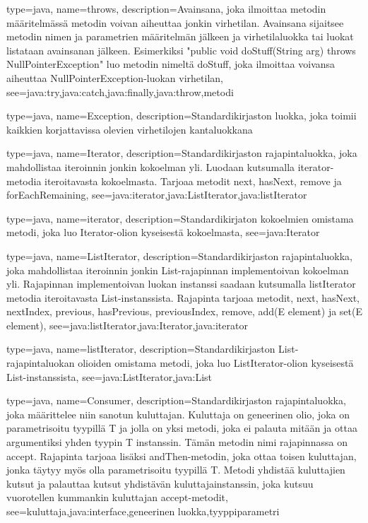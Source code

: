 {
	type=java,
	name=throws,
	description={Avainsana, joka ilmoittaa metodin määritelmässä metodin voivan aiheuttaa jonkin
virhetilan. Avainsana sijaitsee metodin nimen ja parametrien määritelmän jälkeen ja
virhetilaluokka tai luokat listataan avainsanan jälkeen. Esimerkiksi "public void doStuff(String
arg) throws NullPointerException" luo metodin nimeltä doStuff, joka ilmoittaa voivansa aiheuttaa
NullPointerException-luokan virhetilan},
	see={java:try,java:catch,java:finally,java:throw,metodi}
}

{
	type=java,
	name=Exception,
	description={Standardikirjaston luokka, joka toimii kaikkien korjattavissa olevien
virhetilojen kantaluokkana}
}

{
	type=java,
	name=Iterator,
	description={Standardikirjaston rajapintaluokka, joka mahdollistaa iteroinnin jonkin kokoelman
yli. Luodaan kutsumalla iterator-metodia iteroitavasta kokoelmasta. Tarjoaa metodit next, hasNext,
remove ja forEachRemaining},
	see={java:iterator,java:ListIterator,java:listIterator}
}

{
	type=java,
	name=iterator,
	description={Standardikirjaton kokoelmien omistama metodi, joka luo Iterator-olion kyseisestä
kokoelmasta},
	see={java:Iterator}
}

{
	type=java,
	name=ListIterator,
	description={Standardikirjaston rajapintaluokka, joka mahdollistaa iteroinnin jonkin
List-rajapinnan implementoivan kokoelman yli. Rajapinnan implementoivan luokan instanssi saadaan
kutsumalla listIterator metodia iteroitavasta List-instanssista. Rajapinta tarjoaa metodit, next,
hasNext, nextIndex, previous, hasPrevious, previousIndex, remove, add(E element) ja set(E
element)},
	see={java:listIterator,java:Iterator,java:iterator}
}

{
	type=java,
	name=listIterator,
	description={Standardikirjaston List-rajapintaluokan olioiden omistama metodi, joka luo
ListIterator-olion kyseisestä List-instanssista},
	see={java:ListIterator,java:List}
}

{
	type=java,
	name=Consumer,
	description={Standardikirjaston rajapintaluokka, joka määrittelee niin sanotun kuluttajan.
Kuluttaja on geneerinen olio, joka on parametrisoitu tyypillä T ja jolla on yksi metodi, joka ei
palauta mitään ja ottaa argumentiksi yhden tyypin T instanssin. Tämän metodin nimi rajapinnassa on
accept. Rajapinta tarjoaa lisäksi andThen-metodin, joka ottaa toisen kuluttajan, jonka täytyy myös
olla parametrisoitu tyypillä T. Metodi yhdistää kuluttajien kutsut ja palauttaa kutsut yhdistävän
kuluttajainstanssin, joka kutsuu vuorotellen kummankin kuluttajan accept-metodit},
	see={kuluttaja,java:interface,geneerinen luokka,tyyppiparametri}
}

